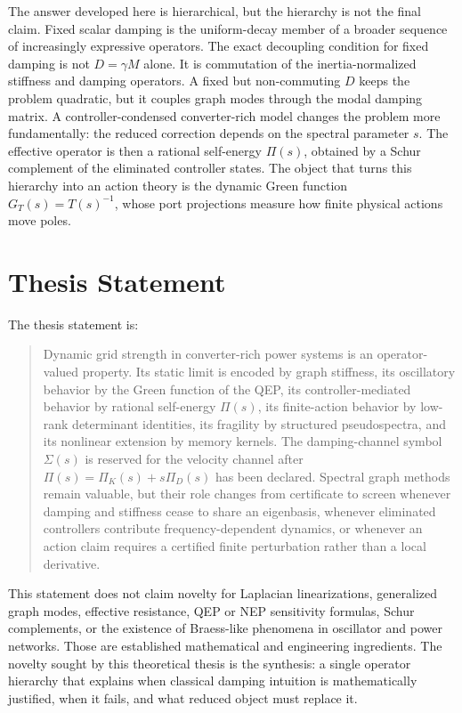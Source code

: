 The answer developed here is hierarchical, but the hierarchy is not the final
claim. Fixed scalar damping is the uniform-decay member of a broader sequence
of increasingly expressive operators. The exact decoupling condition for fixed
damping is not \(D=\gamma M\) alone. It is commutation of the
inertia-normalized stiffness and damping operators. A fixed but non-commuting
\(D\) keeps the problem quadratic, but it couples graph modes through the modal
damping matrix. A controller-condensed converter-rich model changes the problem
more fundamentally: the reduced correction depends on the spectral parameter
\(s\). The effective operator is then a rational self-energy \(\Pi(s)\),
obtained by a Schur complement of the eliminated controller states. The object
that turns this hierarchy into an action theory is the dynamic Green function
\(G_T(s)=T(s)^{-1}\), whose port projections measure how finite physical
actions move poles.

\section{Thesis Statement}

The thesis statement is:

\begin{quote}
Dynamic grid strength in converter-rich power systems is an operator-valued
property. Its static limit is encoded by graph stiffness, its oscillatory
behavior by the Green function of the QEP, its controller-mediated behavior by
rational self-energy \(\Pi(s)\), its finite-action behavior by low-rank
determinant identities, its fragility by structured pseudospectra, and its
nonlinear extension by memory kernels. The damping-channel symbol
\(\Sigma(s)\) is reserved for the velocity channel after
\(\Pi(s)=\Pi_K(s)+s\Pi_D(s)\) has been declared. Spectral graph methods remain
valuable, but their role changes from certificate to screen whenever damping
and stiffness cease to share an eigenbasis, whenever eliminated controllers
contribute frequency-dependent dynamics, or whenever an action claim requires
a certified finite perturbation rather than a local derivative.
\end{quote}

This statement does not claim novelty for Laplacian linearizations,
generalized graph modes, effective resistance, QEP or NEP sensitivity
formulas, Schur complements, or the existence of Braess-like phenomena in
oscillator and power networks. Those are established mathematical and
engineering ingredients. The novelty sought by this theoretical thesis is the
synthesis: a single operator hierarchy that explains when classical damping
intuition is mathematically justified, when it fails, and what reduced object
must replace it.

